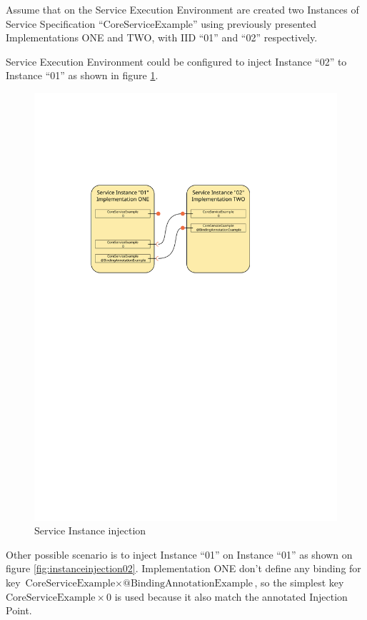 Assume that on the Service Execution Environment are created two Instances of Service Specification ``CoreServiceExample'' using previously presented Implementations ONE and TWO, with IID ``01'' and ``02'' respectively.

Service Execution Environment could be configured to inject Instance ``02'' to Instance ``01'' as shown in figure \ref{fig:instanceinjection01}.

\begin{figure}[h!]
 \centering
 \includegraphics[width=1\textwidth]{instanceInjection01}
 \caption{Service Instance injection}
 \label{fig:instanceinjection01}
\end{figure}

Other possible scenario is to inject Instance ``01'' on Instance ``01'' as shown on figure \ref{fig:instanceinjection02}. Implementation ONE don't define any binding for key $\text{CoreServiceExample}\times \text{@BindingAnnotationExample}$, so the simplest key $\text{CoreServiceExample}\times 0$ is used because it also match the annotated Injection Point.

